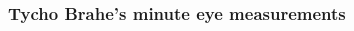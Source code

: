 \documentclass{beamer}
\begin{document}
\begin{frame}
  \frametitle{Tycho Brahe's minute eye measurements}
  \begin{columns}
    \begin{column}{0.4\textwidth}
    \end{column}
    \begin{column}{0.5\textwidth}
\end{column}
\end{columns}
\end{frame}
\end{document}
